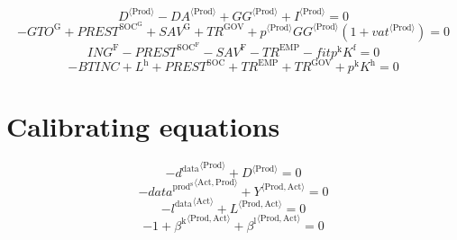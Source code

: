 \begin{equation}
{D}^{\langle \mathrm{Prod}\rangle} - {{D\!A}}^{\langle \mathrm{Prod}\rangle} + {{G\!G}}^{\langle \mathrm{Prod}\rangle} + {I}^{\langle \mathrm{Prod}\rangle} = 0
\end{equation}
\begin{equation}
-{G\!T\!O}^{\mathrm{G}} + {P\!R\!E\!S\!T}^{\mathrm{SOC}^{\mathrm{G}}} + {S\!A\!V}^{\mathrm{G}} + {T\!R}^{\mathrm{GOV}} + {{p}^{\langle \mathrm{Prod}\rangle}} {{{G\!G}}^{\langle \mathrm{Prod}\rangle}} \left(1 + {{v\!a\!t}}^{\langle \mathrm{\mathrm{Prod}}\rangle}\right) = 0
\end{equation}
\begin{equation}
{I\!N\!G}^{\mathrm{F}} - {P\!R\!E\!S\!T}^{\mathrm{SOC}^{\mathrm{F}}} - {S\!A\!V}^{\mathrm{F}} - {T\!R}^{\mathrm{EMP}} - {{f\!i\!t}} {p^{\mathrm{k}}} {K^{\mathrm{f}}} = 0
\end{equation}
\begin{equation}
-{B\!T\!I\!N\!C} + L^{\mathrm{h}} + {P\!R\!E\!S\!T}^{\mathrm{SOC}} + {T\!R}^{\mathrm{EMP}} + {T\!R}^{\mathrm{GOV}} + {p^{\mathrm{k}}} {K^{\mathrm{h}}} = 0
\end{equation}



\section{Calibrating equations}

\begin{equation}
-{d^{\mathrm{data}}}^{\langle \mathrm{\mathrm{Prod}}\rangle} + {D}^{\langle \mathrm{Prod}\rangle} = 0
\end{equation}
\begin{equation}
-{{d\!a\!t\!a}^{\mathrm{prod}^{\mathrm{s}}}}^{\langle \mathrm{\mathrm{Act}},\mathrm{\mathrm{Prod}}\rangle} + {Y}^{\langle \mathrm{Prod},\mathrm{Act}\rangle} = 0
\end{equation}
\begin{equation}
-{l^{\mathrm{data}}}^{\langle \mathrm{\mathrm{Act}}\rangle} + {L}^{\langle \mathrm{Prod},\mathrm{Act}\rangle} = 0
\end{equation}
\begin{equation}
-1 + {\beta^{\mathrm{k}}}^{\langle \mathrm{\mathrm{Prod}},\mathrm{\mathrm{Act}}\rangle} + {\beta^{\mathrm{l}}}^{\langle \mathrm{\mathrm{Prod}},\mathrm{\mathrm{Act}}\rangle} = 0
\end{equation}





